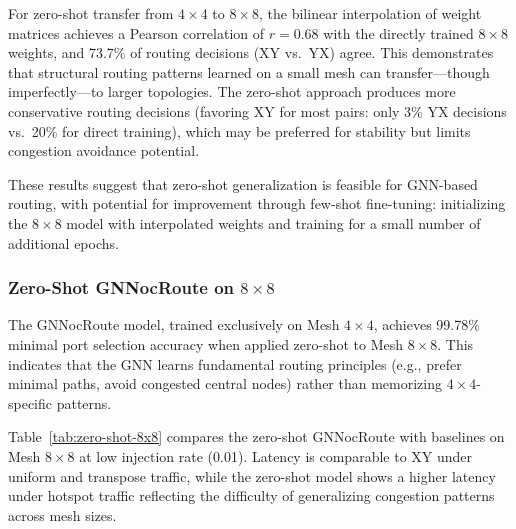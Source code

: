 For zero-shot transfer from $4\times4$ to $8\times8$, the bilinear interpolation of weight matrices achieves a Pearson correlation of $r = 0.68$ with the directly trained $8\times8$ weights, and 73.7\% of routing decisions (XY vs.~YX) agree. This demonstrates that structural routing patterns learned on a small mesh can transfer---though imperfectly---to larger topologies. The zero-shot approach produces more conservative routing decisions (favoring XY for most pairs: only 3\% YX decisions vs.~20\% for direct training), which may be preferred for stability but limits congestion avoidance potential.

These results suggest that zero-shot generalization is feasible for GNN-based routing, with potential for improvement through few-shot fine-tuning: initializing the $8\times8$ model with interpolated weights and training for a small number of additional epochs.

\subsubsection{Zero-Shot GNNocRoute on $8\times8$}

The GNNocRoute model, trained exclusively on Mesh $4\times4$, achieves 99.78\% minimal port selection accuracy when applied zero-shot to Mesh $8\times8$. This indicates that the GNN learns fundamental routing principles (e.g., prefer minimal paths, avoid congested central nodes) rather than memorizing $4\times4$-specific patterns.

Table~\ref{tab:zero-shot-8x8} compares the zero-shot GNNocRoute with baselines on Mesh $8\times8$ at low injection rate (0.01). Latency is comparable to XY under uniform and transpose traffic, while the zero-shot model shows a higher latency under hotspot traffic reflecting the difficulty of generalizing congestion patterns across mesh sizes.

\begin{table}[h]
\centering
\caption{Zero-shot GNNocRoute on Mesh $8\times8$ at injection rate 0.01}
\label{tab:zero-shot-8x8}
\end{table}

